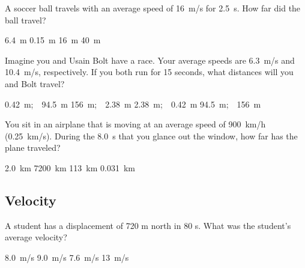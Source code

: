 \documentclass[addpoints]{exam}
\begin{document}
\begin{questions}



\question
A soccer ball travels with an average speed of \SI{16}{m/s} for \SI{2.5}{s}. How far did the ball travel?

\begin{choices}
    \choice \SI{6.4}{m}
    \choice \SI{0.15}{m}
    \choice \SI{16}{m}
    \correctchoice \SI{40}{m}
\end{choices}

\question
Imagine you and Usain Bolt have a race. Your average speeds are \SI{6.3}{m/s} and \SI{10.4}{m/s}, respectively. If you both run for 15 seconds, what distances will you and Bolt travel?

\begin{choices}
    \choice  \SI{0.42}{m};\ \ \SI{94.5}{m}
    \choice  \SI{156}{m};\ \ \SI{2.38}{m}
    \choice  \SI{2.38}{m};\ \ \SI{0.42}{m}
    \correctchoice \SI{94.5}{m};\ \ \SI{156}{m} 
\end{choices}

\question %
You sit in an airplane that is moving at an average speed of 
\SI{900}{km/h} (\SI{0.25}{km/s}). During the \SI{8.0}{s}
that you glance out the window, how far has the plane traveled?

\begin{choices}
\CorrectChoice \SI{2.0}{km}
\choice \SI{7200}{km}
\choice \SI{113}{km}
\choice \SI{0.031}{km}
\end{choices}


\subsection*{Velocity}
\question %
A student has a displacement of 720 m north in 80 s. What was the student's average velocity?

\begin{choices}
\choice \SI{8.0}{m/s}
\CorrectChoice \SI{9.0}{m/s}
\choice \SI{7.6}{m/s}
\choice \SI{13}{m/s}
\end{choices}



\end{questions}
\end{document}
